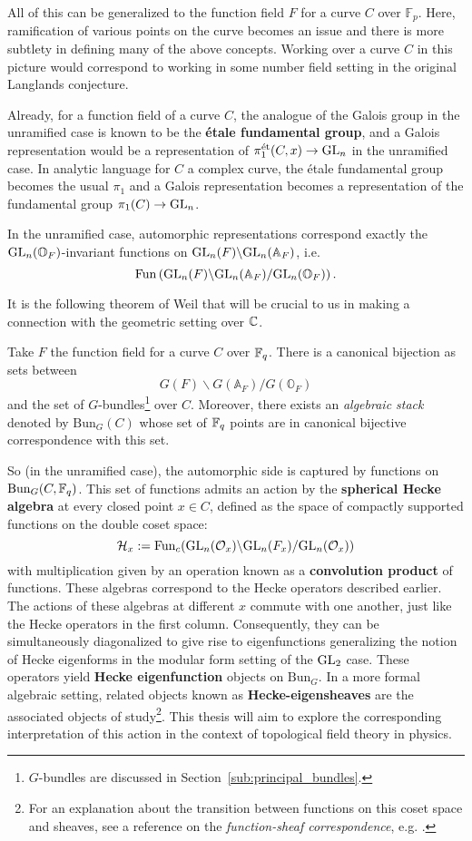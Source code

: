 All of this can be generalized to the function field $F$ for a curve $C$ over $\mathbb F_p$. Here, ramification of various points on the curve becomes an issue and there is more subtlety in defining many of the above concepts. Working over a curve $C$ in this picture would correspond to working in some number field setting in the original Langlands conjecture. 

Already, for a function field of a curve $C$, the analogue of the Galois group in the unramified case is known to be the \textbf{\'etale fundamental group}, and a Galois representation would be a representation of $\pi_1^{\text{\'et}}(C,x) \to \mathrm{GL}_n$ in the unramified case. In analytic language for $C$ a complex curve, the \'etale fundamental group becomes the usual $\pi_1$ and a Galois representation becomes a representation of the fundamental group $\pi_1(C) \to \mathrm{GL}_n$. 

In the unramified case, automorphic representations correspond exactly the $\mathrm{GL}_n(\mathbb O_F)$-invariant functions on $\mathrm{GL}_n (F)\backslash \mathrm{GL}_n(\mathbb A_F)$, i.e. 
\[
	\mathrm{Fun} \left(\mathrm{GL}_n (F)\backslash \mathrm{GL}_n(\mathbb A_F)/\mathrm{GL}_n(\mathbb O_F) \right).
\]

It is the following theorem of Weil that will be crucial to us in making a connection with the geometric setting over $\mathbb{C}$.
\begin{theorem}
	Take $F$ the function field for a curve $C$ over $\mathbb{F}_q$. There is a canonical bijection as sets between
	\[
		G (F)\backslash G(\mathbb A_F)/G(\mathbb O_F)
	\]
	and the set of $G$-bundles\footnote{$G$-bundles are discussed in Section~\ref{sub:principal_bundles}.} over $C$. Moreover, there exists an \emph{algebraic stack} denoted by $\mathrm{Bun}_G(C)$ whose set of $\mathbb{F}_q$ points are in canonical bijective correspondence with this set.
\end{theorem}

So (in the unramified case), the automorphic side is captured by functions on $\mathrm{Bun}_G(C, \mathbb{F}_q)$. 
This set of functions admits an action by the \textbf{spherical Hecke algebra} at every closed point $x \in C$, defined as the space of compactly supported functions on the double coset space:
\[
	\mathcal H_x := \mathrm{Fun}_c (\mathrm{GL}_n (\mathcal O_x)\backslash \mathrm{GL}_n(F_x)/\mathrm{GL}_n(\mathcal O_x))
\]
with multiplication given by an operation known as a \textbf{convolution product} of functions. These algebras correspond to the Hecke operators described earlier. The actions of these algebras at different $x$ commute with one another, just like the Hecke operators in the first column. Consequently, they can be simultaneously diagonalized to give rise to eigenfunctions generalizing the notion of Hecke eigenforms in the modular form setting of the $\mathrm{GL}_2$ case. These operators yield \textbf{Hecke eigenfunction} objects on $\mathrm{Bun}_G$. In a more formal algebraic setting, related objects known as \textbf{Hecke-eigensheaves} are the associated objects of study\footnote{For an explanation about the transition between functions on this coset space and sheaves, see a reference on the \emph{function-sheaf correspondence}, e.g. \cite{shin2005}.}. This thesis will aim to explore the corresponding interpretation of this action in the context of topological field theory in physics.

